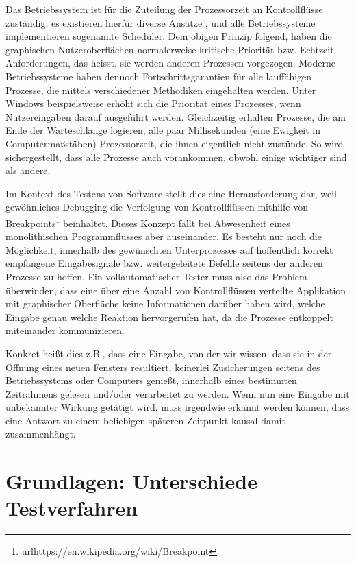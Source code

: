 Das Betriebssystem ist für die Zuteilung der Prozessorzeit an Kontrollflüsse
zuständig, es existieren hierfür diverse Ansätze \cite{ArpaciDusseau14-Book}, 
und alle Betriebssysteme implementieren sogenannte \glqq{}Scheduler\grqq{}.
Dem obigen Prinzip folgend, haben die graphischen Nutzeroberflächen normalerweise
kritische Priorität bzw. \glqq{}Echtzeit\grqq{}-Anforderungen, das heisst, sie
werden anderen Prozessen vorgezogen. Moderne Betriebssysteme 
\cite{Stallings:2004:OS:993867} haben dennoch
Fortschrittsgarantien für alle lauffähigen Prozesse, die mittels verschiedener
Methodiken eingehalten werden. Unter Windows beispielsweise erhöht sich die
Priorität eines Prozesses, wenn Nutzereingaben darauf ausgeführt werden.
Gleichzeitig erhalten Prozesse, die am Ende der Warteschlange logieren,
alle paar Millisekunden (eine Ewigkeit in Computermaßstäben) Prozessorzeit,
die ihnen eigentlich nicht zustünde. So wird sichergestellt, dass alle Prozesse
auch vorankommen, obwohl einige wichtiger sind als andere.

Im Kontext des Testens von Software stellt dies eine Herausforderung dar,
weil gewöhnliches \glqq{}Debugging\grqq{} die Verfolgung von Kontrollflüssen
mithilfe von Breakpoints\footnote{url{https://en.wikipedia.org/wiki/Breakpoint}}
beinhaltet. Dieses Konzept fällt bei Abwesenheit eines monolithischen Programmflusses
aber auseinander. Es besteht nur noch die Möglichkeit, innerhalb des gewünschten
Unterprozesses auf hoffentlich korrekt empfangene Eingabesignale bzw. weitergeleitete
Befehle seitens der anderen Prozesse zu hoffen. Ein vollautomatischer Tester
muss also das Problem überwinden, dass eine über eine Anzahl von Kontrollflüssen
verteilte Applikation mit graphischer Oberfläche keine Informationen darüber
haben wird, welche Eingabe genau welche Reaktion hervorgerufen hat, da
die Prozesse entkoppelt miteinander kommunizieren.

Konkret heißt dies z.B., dass eine Eingabe, von der wir wissen, dass sie in der 
Öffnung eines neuen Fensters resultiert, keinerlei Zusicherungen seitens des 
Betriebssystems oder Computers genießt, innerhalb eines bestimmten Zeitrahmens 
gelesen und/oder verarbeitet zu werden. Wenn nun eine Eingabe mit unbekannter Wirkung 
getätigt wird, muss irgendwie erkannt werden können, dass eine Antwort zu einem 
beliebigen späteren Zeitpunkt kausal damit zusammenhängt.


\section{Grundlagen: Unterschiede Testverfahren}\label{section:testingapproaches}



